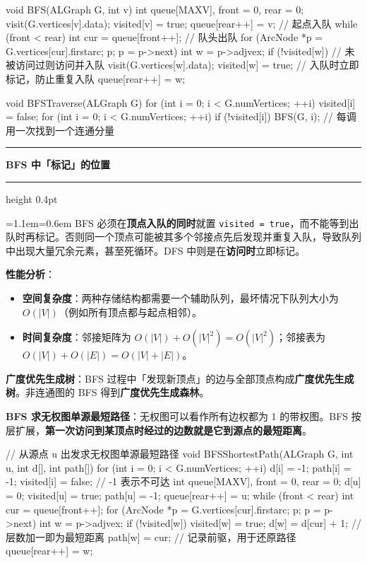 \documentclass[11pt,openany,UTF8]{ctexbook}
\newcommand{\callouthead}[2]{%
  \par\addvspace{7pt}\noindent
  {\color{#1}\rule[-0.15em]{3pt}{1.05em}}\hspace{0.5em}%
  {\bfseries\color{#1}#2}\par\nobreak\vspace{-0.35em}%
  {\color{rulesep}\hrule height 0.4pt}\nobreak\vspace{0.45em}%
  \begingroup\small\setlength{\parindent}{0pt}%
  \leftskip=1.1em\rightskip=0.6em\noindent\ignorespaces}
\newcommand{\calloutend}{\par\endgroup\addvspace{7pt}}
\newenvironment{callwarn}[1]{\callouthead{warnbar}{#1}}{\calloutend}
\begin{document}
\begin{codebox}
void BFS(ALGraph G, int v) {
    int queue[MAXV], front = 0, rear = 0;
    visit(G.vertices[v].data);
    visited[v] = true;
    queue[rear++] = v;                       // 起点入队
    while (front < rear) {
        int cur = queue[front++];            // 队头出队
        for (ArcNode *p = G.vertices[cur].firstarc; p; p = p->next) {
            int w = p->adjvex;
            if (!visited[w]) {               // 未被访问过则访问并入队
                visit(G.vertices[w].data);
                visited[w] = true;           // 入队时立即标记，防止重复入队
                queue[rear++] = w;
            }
        }
    }
}

void BFSTraverse(ALGraph G) {
    for (int i = 0; i < G.numVertices; ++i) visited[i] = false;
    for (int i = 0; i < G.numVertices; ++i)
        if (!visited[i]) BFS(G, i);          // 每调用一次找到一个连通分量
}
\end{codebox}

\begin{callwarn}{BFS 中「标记」的位置}
BFS 必须在\textbf{顶点入队的同时}就置 \texttt{visited =\allowbreak{} true}，而不能等到出队时再标记。否则同一个顶点可能被其多个邻接点先后发现并重复入队，导致队列中出现大量冗余元素，甚至死循环。DFS 中则是在\textbf{访问时}立即标记。

\end{callwarn}

\textbf{性能分析}：

\begin{itemize}
\item \textbf{空间复杂度}：两种存储结构都需要一个辅助队列，最坏情况下队列大小为 $O(|V|)$（例如所有顶点都与起点相邻）。
\item \textbf{时间复杂度}：邻接矩阵为 $O(|V|)+O(|V|^{2})=O(|V|^{2})$；邻接表为 $O(|V|)+O(|E|)=O(|V|+|E|)$。
\end{itemize}
\textbf{广度优先生成树}：BFS 过程中「发现新顶点」的边与全部顶点构成\textbf{广度优先生成树}。非连通图的 BFS 得到\textbf{广度优先生成森林}。

\textbf{BFS 求无权图单源最短路径}：无权图可以看作所有边权都为 1 的带权图。BFS 按层扩展，\textbf{第一次访问到某顶点时经过的边数就是它到源点的最短距离}。

\begin{codebox}
// 从源点 u 出发求无权图单源最短路径
void BFSShortestPath(ALGraph G, int u, int d[], int path[]) {
    for (int i = 0; i < G.numVertices; ++i) {
        d[i] = -1; path[i] = -1; visited[i] = false;   // -1 表示不可达
    }
    int queue[MAXV], front = 0, rear = 0;
    d[u] = 0; visited[u] = true; path[u] = -1;
    queue[rear++] = u;
    while (front < rear) {
        int cur = queue[front++];
        for (ArcNode *p = G.vertices[cur].firstarc; p; p = p->next) {
            int w = p->adjvex;
            if (!visited[w]) {
                visited[w] = true;
                d[w] = d[cur] + 1;       // 层数加一即为最短距离
                path[w] = cur;           // 记录前驱，用于还原路径
                queue[rear++] = w;
            }
        }
    }
}
\end{codebox}
\end{document}
